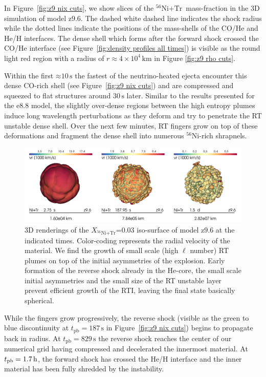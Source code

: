 \documentclass[fleqn,usenatbib]{mnras}
\newcommand{\tpb}{\ensuremath{t_{\text{pb}}}}
\newcommand{\nickel}{\ensuremath{\mathrm{^{56}Ni}}\xspace}
\newcommand{\tracer}{\ensuremath{\mathrm{Tr}}\xspace}
\newcommand{\s}{\ensuremath{\text{s}}}
\newcommand{\onemg}{\ensuremath{\mathrm{e8.8}}\xspace}
\newcommand{\znine}{\ensuremath{\mathrm{z9.6}}\xspace}
\begin{document}
In Figure~\ref{fig:z9 nix cuts}, we show slices of the $\nickel\mathord{+}\tracer\,$  mass-fraction in the 3D simulation of model \znine. 
The dashed white dashed line indicates the shock radius while the dotted lines indicate the positions of 
the mass-shells of the CO/He and He/H interfaces.
The dense shell which forms after the forward shock crossed 
the CO/He interface (see Figure~\ref{fig:density profiles all times}) 
is visible as the round light red region with a radius of $r\mathrm{\approx} 4\times 10^4\,\mathrm{km}$ 
in Figure \ref{fig:z9 rho cuts}.  

Within the first $\mathord{\approx}10\,\s$ the fastest of the 
neutrino-heated ejecta encounter this dense CO-rich shell (see Figure~\ref{fig:z9 nix cuts})
and are compressed and squeezed to flat structures around $30\,\s$ later.
Similar to the results presented for the \onemg model, the slightly over-dense regions between the high 
entropy plumes induce long wavelength perturbations as they deform and 
try to penetrate the RT unstable dense shell. 
Over the next few minutes, RT fingers grow on top of these deformations and fragment the 
dense shell into numerous \nickel-rich shrapnels.

\begin{figure}%
\includegraphics[width=\textwidth]{pic/z9_tile_1_3.png}
    \caption{3D renderings of the $X_{\nickel\mathord{+}\tracer}\mathord{=}0.03$ 
             iso-surface of model \znine at the indicated times.  Color-coding represents the radial velocity of the material. We find the growth of small scale (high $\ell$ number) RT plumes on top of the initial asymmetries of the explosion. Early formation of the reverse shock already in the He-core, the small scale initial asymmetries and the small size of the RT unstable layer prevent efficient growth of the RTI, leaving the final state basically spherical. }
\label{fig:z9 3d rendering}
\end{figure}%
While the fingers grow progressively, the reverse shock (visible as the green to blue discontinuity 
at $\tpb=187\,\s$ in Figure~\ref{fig:z9 nix cuts}) begins to propagate back in radius. 
At $\tpb=829\,\s$ the reverse shock reaches the center of our numerical grid having 
compressed and decelerated the innermost material. 
At $\tpb=1.7\,\rm h$, the forward shock has crossed the He/H interface and the inner 
material has been fully shredded by the instability.
\end{document}
